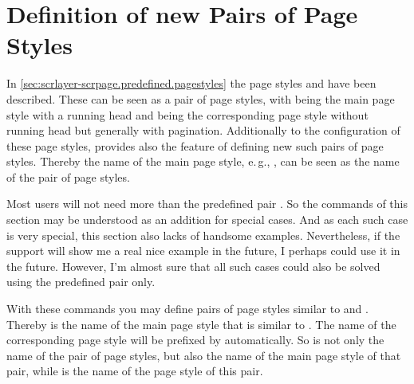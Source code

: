 
\section{Definition of new Pairs of Page Styles}

In \autoref{sec:scrlayer-scrpage.predefined.pagestyles} the page styles
 and  have been
described. These can be seen as a pair of page styles, with
 being the main page style with a running head and
 being the corresponding  page
style without running head but generally with pagination. Additionally to the
configuration of these page styles,  provides also
the feature of defining new such pairs of page styles. Thereby the name of the
main page style, e.\,g., , can be seen as the name of the
pair of page styles.

Most users will not need more than the predefined pair
. So the commands of this section may be understood as
an addition for special cases. And as each such case is very special,
this section also lacks of handsome examples. Nevertheless, if the support
will show me a real nice example in the future, I perhaps could use it in
the future. However, I'm almost sure that all such cases could also be
solved using the predefined pair only.

\begin{Declaration}
\end{Declaration}
With these commands you may define pairs of page styles similar to
 and . Thereby
 is the name of the main page style that is similar to
. The name of the corresponding  page
style will be prefixed by  automatically. So  is
not only the name of the pair of page styles, but also the name of the main
page style of that pair, while  is the name of the
 page style of this pair.

